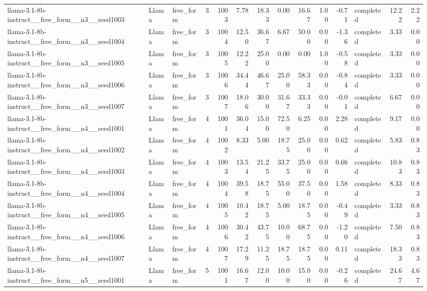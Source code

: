 \begin{longtable}{lllrrrrrrrrlrr}
llama-3.1-8b-instruct\_\_free\_form\_\_n3\_\_seed1003 & Llama & free\_form & 3 & 1003 & 7.78 & 18.33 & 0.00 & 16.67 & 1.00 & -0.71 & completed & 12.22 & 2.22 \\
llama-3.1-8b-instruct\_\_free\_form\_\_n3\_\_seed1004 & Llama & free\_form & 3 & 1004 & 12.50 & 36.67 & 6.67 & 50.00 & 0.00 & -1.36 & completed & 3.33 & 0.00 \\
llama-3.1-8b-instruct\_\_free\_form\_\_n3\_\_seed1005 & Llama & free\_form & 3 & 1005 & 12.22 & 25.00 & 0.00 & 0.00 & 1.00 & -0.58 & completed & 3.33 & 0.00 \\
llama-3.1-8b-instruct\_\_free\_form\_\_n3\_\_seed1006 & Llama & free\_form & 3 & 1006 & 34.44 & 46.67 & 25.00 & 58.33 & 0.00 & -0.84 & completed & 3.33 & 0.00 \\
llama-3.1-8b-instruct\_\_free\_form\_\_n3\_\_seed1007 & Llama & free\_form & 3 & 1007 & 18.06 & 30.00 & 31.67 & 33.33 & 0.00 & -0.01 & completed & 6.67 & 0.00 \\
llama-3.1-8b-instruct\_\_free\_form\_\_n4\_\_seed1001 & Llama & free\_form & 4 & 1001 & 36.04 & 15.00 & 72.50 & 6.25 & 0.00 & 2.28 & completed & 9.17 & 0.00 \\
llama-3.1-8b-instruct\_\_free\_form\_\_n4\_\_seed1002 & Llama & free\_form & 4 & 1002 & 8.33 & 5.00 & 18.75 & 25.00 & 0.00 & 0.62 & completed & 5.83 & 0.83 \\
llama-3.1-8b-instruct\_\_free\_form\_\_n4\_\_seed1003 & Llama & free\_form & 4 & 1003 & 13.54 & 21.25 & 33.75 & 25.00 & 0.00 & 0.66 & completed & 10.83 & 0.83 \\
llama-3.1-8b-instruct\_\_free\_form\_\_n4\_\_seed1004 & Llama & free\_form & 4 & 1004 & 39.58 & 18.75 & 55.00 & 37.50 & 0.00 & 1.58 & completed & 8.33 & 0.83 \\
llama-3.1-8b-instruct\_\_free\_form\_\_n4\_\_seed1005 & Llama & free\_form & 4 & 1005 & 10.42 & 18.75 & 5.00 & 18.75 & 0.00 & -0.49 & completed & 3.33 & 0.83 \\
llama-3.1-8b-instruct\_\_free\_form\_\_n4\_\_seed1006 & Llama & free\_form & 4 & 1006 & 30.42 & 43.75 & 10.00 & 68.75 & 0.00 & -1.20 & completed & 7.50 & 0.83 \\
llama-3.1-8b-instruct\_\_free\_form\_\_n4\_\_seed1007 & Llama & free\_form & 4 & 1007 & 17.29 & 11.25 & 18.75 & 18.75 & 0.00 & 0.11 & completed & 18.33 & 0.83 \\
llama-3.1-8b-instruct\_\_free\_form\_\_n5\_\_seed1001 & Llama & free\_form & 5 & 1001 & 16.67 & 12.00 & 10.00 & 15.00 & 0.00 & -0.26 & completed & 24.67 & 4.67 \\

\end{longtable}
